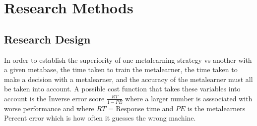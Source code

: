 \chapter{Research Methods}
\label{Chapter3}
\section{Research Design}
In order to establish the superiority of one metalearning strategy vs another with a given
metabase, the time taken to train the metalearner, the time taken to make a decision with a metalearner, and the accuracy of the metalearner must all be taken into account. A possible cost function that takes these
variables into account is the Inverse error score $\frac{RT}{1-PE}$ where a larger number is asssociated
with worse performance and where $RT$ = Response time and $PE$ is the metalearners Percent error which
is how often it guesses the wrong machine.
